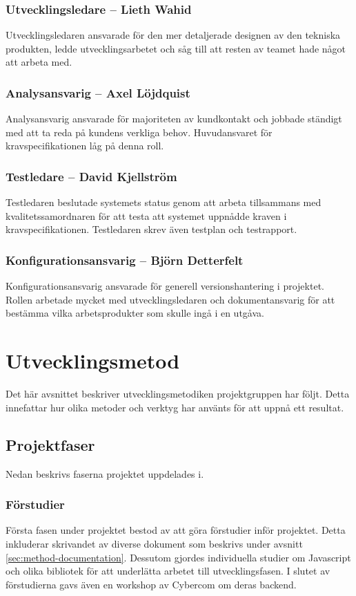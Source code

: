 \subsubsection*{Utvecklingsledare -- Lieth Wahid}
Utvecklingsledaren ansvarade för den mer detaljerade designen av den tekniska produkten, ledde utvecklingsarbetet och såg till att resten av teamet hade något att arbeta med.

\subsubsection*{Analysansvarig -- Axel Löjdquist}
Analysansvarig ansvarade för majoriteten av kundkontakt och jobbade ständigt med att ta reda på kundens verkliga behov. Huvudansvaret för kravspecifikationen låg på denna roll.

\subsubsection*{Testledare -- David Kjellström}
Testledaren beslutade systemets status genom att arbeta tillsammans med kvalitetssamordnaren för att testa att systemet uppnådde kraven i kravspecifikationen. Testledaren skrev även testplan och testrapport.

\subsubsection*{Konfigurationsansvarig -- Björn Detterfelt}
Konfigurationsansvarig ansvarade för generell versionshantering i projektet. Rollen arbetade mycket med utvecklingsledaren och dokumentansvarig för att bestämma vilka arbetsprodukter som skulle ingå i en utgåva.

\section{Utvecklingsmetod}
Det här avsnittet beskriver utvecklingsmetodiken projektgruppen har följt. Detta innefattar hur olika metoder och verktyg har använts för att uppnå ett resultat.

\subsection{Projektfaser}
Nedan beskrivs faserna projektet uppdelades i.

\subsubsection*{Förstudier}
Första fasen under projektet bestod av att göra förstudier inför projektet. Detta inkluderar skrivandet av diverse dokument som beskrivs under avsnitt \ref{sec:method-documentation}. Dessutom gjordes individuella studier om Javascript och olika bibliotek för att underlätta arbetet till utvecklingsfasen. I slutet av förstudierna gavs även en workshop av Cybercom om deras backend.

